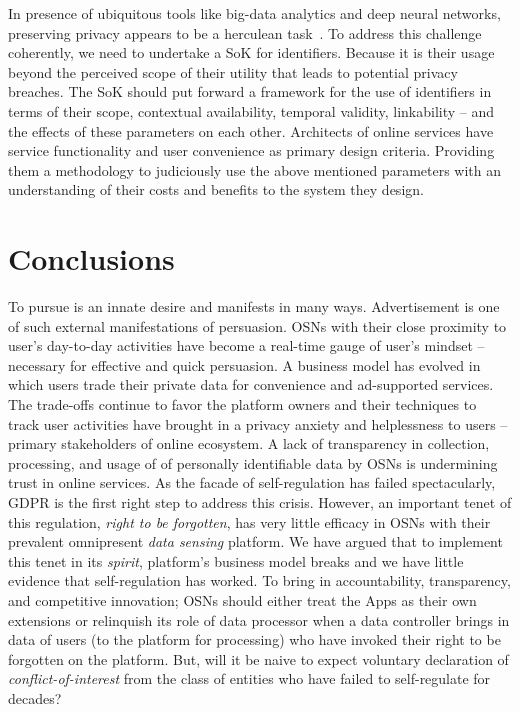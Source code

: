 \documentclass[runningheads]{llncs}
\begin{document}
In presence of ubiquitous tools like big-data analytics and deep
neural networks, preserving privacy appears to be a herculean
task~\cite{unique-mall,unique-crowd}. To address this challenge
coherently, we need to undertake a SoK for identifiers. Because it is
their usage beyond the perceived scope of their utility that leads to
potential privacy breaches. The SoK should put forward a framework for
the use of identifiers in terms of their scope, contextual
availability, temporal validity, linkability -- and the effects of
these parameters on each other. Architects of online services have
service functionality and user convenience as primary design
criteria. Providing them a methodology to judiciously use the above
mentioned parameters with an understanding of their costs and benefits
to the system they design.


\section{Conclusions}
\label{sec:conclusion}
\noindent To pursue is an innate desire and manifests in many
ways. Advertisement is one of such external manifestations of
persuasion. OSNs with their close proximity to user's day-to-day
activities have become a real-time gauge of user's mindset --
necessary for effective and quick persuasion. A business model has
evolved in which users trade their private data for convenience and
ad-supported services. The trade-offs continue to favor the platform
owners and their techniques to track user activities have brought in a
privacy anxiety and helplessness to users -- primary stakeholders of
online ecosystem. A lack of transparency in collection, processing, and
usage of of personally identifiable data by OSNs is undermining trust
in online services. As the facade of self-regulation has failed
spectacularly, GDPR is the first right step to address this
crisis. However, an important tenet of this regulation, \textit{right
  to be forgotten}, has very little efficacy in OSNs with their
prevalent omnipresent \textit{data sensing} platform. We have argued
that to implement this tenet in its \textit{spirit}, platform's
business model breaks and we have little evidence that self-regulation
has worked. To bring in accountability, transparency, and competitive
innovation; OSNs should either treat the Apps as their own extensions
or relinquish its role of data processor when a data controller brings
in data of users (to the platform for processing) who have invoked
their right to be forgotten on the platform. But, will it be naive to
expect voluntary declaration of \textit{conflict-of-interest} from the
class of entities who have failed to self-regulate for decades?
\end{document}
